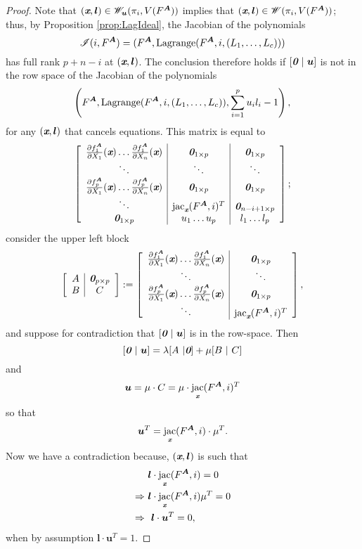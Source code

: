 \documentclass[a4paper]{article}
\def\sI{\mathscr{I}}
\def\bz{\textit{\textbf{0}}}
\def\mA{{\bm A}}
\def\ub{{\bm u}}
\def\lb{{\bm l}}
\def\xb{\textit{\textbf{x}}}
\DeclareMathOperator{\jac}{jac}
\DeclareMathOperator{\lag}{Lagrange}
\def\pa{\partial}
\def\lagFA{{\bm\lag}(F^{\mA},i,(L_1,\hdots,L_c))}
\def\udl{\sum_{i=1}^pu_il_i}
\begin{document}
    \begin{proof}
    Note that $(\xb,\lb)\in\mathscr{W}_{\ub}(\pi_i,V(F^{\mA}))$ implies that $(\xb,\lb)\in\mathscr{W}(\pi_i,V(F^{\mA}))$; thus, by Proposition \ref{prop:LagIdeal}, the Jacobian of the polynomials \[\sI(i,F^{\mA}) = (F^{\mA},\lagFA)\] has full rank $p+n-i$ at $(\xb,\lb)$. The conclusion therefore holds if $[\bz~|~\ub]$ is not in the row space of the Jacobian of the polynomials
    \[
    \left(F^{\mA},\lagFA,\udl -1\right),
    \]
    for any $(\xb,\bm l)$ that cancels equations. This matrix is equal to
    \[
    \left[ 
    \begin{array}{c|c|c}
    \frac{\pa f_1^{\mA}}{\pa X_1}(\xb) \hdots \frac{\pa f_1^{\mA}}{\pa X_n}(\xb) & \bz_{1\times p} & \bz_{1\times p}\\
    \ddots & \ddots & \ddots\\
    \frac{\pa f_p^{\mA}}{\pa X_1}(\xb) \hdots \frac{\pa f_p^{\mA}}{\pa X_n}(\xb) & \bz_{1\times p} & \bz_{1\times p}\\
    \ddots &\jac_{\xb}(F^{\mA},i)^T & \bz_{n-i+1\times p}\\
    \bz_{1 \times p} & u_1 \hdots u_p & l_1 \hdots l_p 
    \end{array}
    \right];
    \]
    consider the upper left block
    \[
    \left[ 
    \begin{array}{c|c}
    A & \bz_{p\times p} \\
    B & C 
    \end{array}
    \right]
    :=
    \left[ 
    \begin{array}{c|c}
    \frac{\pa f_1^{\mA}}{\pa X_1}(\xb) \hdots \frac{\pa f_1^{\mA}}{\pa X_n}(\xb) & \bz_{1\times p} \\
    \ddots & \ddots \\
    \frac{\pa f_p^{\mA}}{\pa X_1}(\xb) \hdots \frac{\pa f_p^{\mA}}{\pa X_n}(\xb) & \bz_{1\times p} \\
    \ddots &\jac_{\xb}(F^{\mA},i)^T
    \end{array}
    \right],
    \]
    and suppose for contradiction that $[\bz~|~\ub]$ is in the row-space. Then 
    \[
    [\bz~|~\ub]
    =
    \lambda [A~|\bz] + \mu[B~|~C]
    \]
    and 
    \[
    \ub = \mu \cdot C = \mu \cdot \jac_{\xb} (F^{\mA},i)^T
    \]
    so that 
    \[
    \ub^T = \jac_{\xb} (F^{\mA},i) \cdot \mu^T.
    \]
    Now we have a contradiction because, $(\xb,\lb)$ is such that 
    \begin{align*}
        &\lb \cdot \jac_{\xb} (F^{\mA},i)=0\\
        \Rightarrow
        ~&\lb \cdot \jac_{\xb} (F^{\mA},i) \mu^T= 0\\
        \Rightarrow
        ~&~\lb \cdot \ub^T = 0,
    \end{align*}
    when by assumption $\lb \cdot \ub^T = 1.$ 
    \end{proof}
\end{document}
